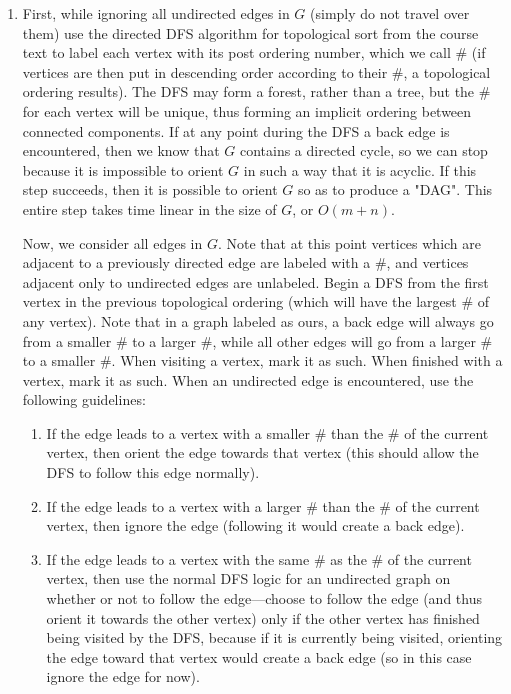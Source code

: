 \documentclass{article}
\begin{document}
\begin{enumerate}
\begin{enumerate}
\item First, while ignoring all undirected edges in $G$ (simply do not travel over them) use the directed DFS algorithm for topological sort from the course text to label each vertex with its post ordering number, which we call $\#$ (if vertices are then put in descending order according to their $\#$, a topological ordering results). The DFS may form a forest, rather than a tree, but the $\#$ for each vertex will be unique, thus forming an implicit ordering between connected components. If at any point during the DFS a back edge is encountered, then we know that $G$ contains a directed cycle, so we can stop because it is impossible to orient $G$ in such a way that it is acyclic. If this step succeeds, then it is possible to orient $G$ so as to produce a "DAG". This entire step takes time linear in the size of $G$, or $O(m + n)$.

\par Now, we consider all edges in $G$.  Note that at this point vertices which are adjacent to a previously directed edge are labeled with a $\#$, and vertices adjacent only to undirected edges are unlabeled.  Begin a DFS from the first vertex in the previous topological ordering (which will have the largest $\#$ of any vertex). Note that in a graph labeled as ours, a back edge will always go from a smaller $\#$ to a larger $\#$, while all other edges will go from a larger $\#$ to a smaller $\#$. When visiting a vertex, mark it as such. When finished with a vertex, mark it as such. When an undirected edge is encountered, use the following guidelines:
\begin{enumerate}
	\item If the edge leads to a vertex with a smaller $\#$ than the $\#$ of the current vertex, then orient the edge towards that vertex (this should allow the DFS to follow this edge normally).
	
	\item If the edge leads to a vertex with a larger $\#$ than the $\#$ of the current vertex, then ignore the edge (following it would create a back edge).
	
	\item If the edge leads to a vertex with the same $\#$ as the $\#$ of the current vertex, then use the normal DFS logic for an undirected graph on whether or not to follow the edge---choose to follow the edge (and thus orient it towards the other vertex) only if the other vertex has finished being visited by the DFS, because if it is currently being visited, orienting the edge toward that vertex would create a back edge (so in this case ignore the edge for now).
	

\end{enumerate}
\end{enumerate}
\end{enumerate}
\end{document}
